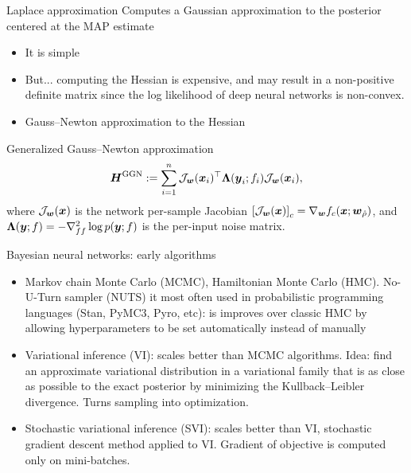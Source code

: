 \documentclass[9pt]{beamer}
\begin{document}
\begin{frame}{Laplace approximation}
Computes a Gaussian approximation to the posterior centered at the MAP estimate

\begin{itemize}
	\item It is simple
	\item But... computing the Hessian is expensive, and may result in a non-positive definite matrix since the log likelihood of deep neural networks is non-convex.
	\item Gauss--Newton approximation to the Hessian
\end{itemize}

\begin{block}{Generalized Gauss--Newton approximation}
	$$\boldsymbol{H}^{\mathrm{GGN}}:= \sum_{i=1}^n \mathcal{J}_{\boldsymbol{w}}(\boldsymbol{x}_i)^{\top}\boldsymbol{\Lambda}(\boldsymbol{y}_i;f_i)\mathcal{J}_{\boldsymbol{w}}(\boldsymbol{x}_i),$$
where $\mathcal{J}_{\boldsymbol{w}}(\boldsymbol{x})$ is the network per-sample Jacobian $\left[\mathcal{J}_{\boldsymbol{w}}(\boldsymbol{x})\right]_{c}=\nabla_{\boldsymbol{w}}f_c(\boldsymbol{x};\boldsymbol{w}_{\hat{\rho}})$, and $\boldsymbol{\Lambda}(\boldsymbol{y};f)=-\nabla^2_{ff}\log p(\boldsymbol{y};f)$ is the per-input noise matrix.%
\end{block}

\end{frame}




\begin{frame}{Bayesian neural networks: early algorithms}
\begin{itemize}[<+->]
	\item \alert{Markov chain Monte Carlo} (MCMC), \alert{Hamiltonian Monte Carlo} (HMC). No-U-Turn sampler (NUTS) it most often used in probabilistic programming languages (Stan, PyMC3, Pyro, etc): is improves over classic HMC by allowing hyperparameters to be set automatically instead of manually
	\item \alert{Variational inference} (VI): scales better than MCMC algorithms. Idea: find an approximate variational distribution in a variational family that is as close as possible to the exact posterior by minimizing the Kullback--Leibler divergence. Turns sampling into optimization.
	\item \alert{Stochastic variational inference} (SVI): scales better than VI, stochastic gradient descent method applied to VI. Gradient of objective is computed only on mini-batches.
\end{itemize}
\end{frame}
\end{document}
